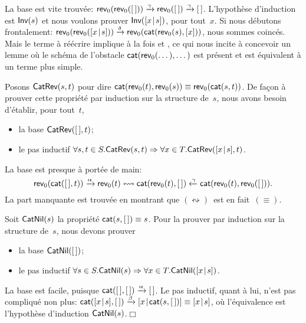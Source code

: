 La base est vite trouvée: \(\textsf{rev}_0(\textsf{rev}_0([\,]))
\xrightarrow{\smash{\gamma}} \textsf{rev}_0([\,])
\xrightarrow{\smash{\gamma}} [\,]\). L'hypothèse d'induction est
\(\textsf{Inv}({s})\) et nous voulons prouver
\(\textsf{Inv}({[{x}\!\mid\!{s}]})\), pour
tout~\(x\).  Si nous débutons frontalement:
\(\textsf{rev}_0(\textsf{rev}_0([{x}\!\mid\!{s}])) \xrightarrow{\smash{\delta}}
\textsf{rev}_0(\textsf{cat}(\textsf{rev}_0(s),[x]))\), nous sommes coincés.
Mais le terme à réécrire implique à la fois  et
, ce qui nous incite à concevoir un lemme où le schéma de
l'obstacle \(\textsf{cat}(\textsf{rev}_0(\dots),\dots)\) est présent et est
équivalent à un terme plus simple.%

Posons
\(\textsf{CatRev}({s,t})\) \label{CatRev}
pour dire \(\textsf{cat}(\textsf{rev}_0(t),\textsf{rev}_0(s)) \equiv
\textsf{rev}_0(\textsf{cat}(s,t))\). De façon à
prouver cette propriété par induction sur la structure de~\(s\), nous
avons besoin d'établir, pour tout~\(t\),
\begin{itemize}

  \item la base \(\textsf{CatRev}({[\,],t})\);

  \item le pas inductif \(\forall s,t \in S.\textsf{CatRev}({s,t})
    \Rightarrow \forall x \in T.\textsf{CatRev}({[{x}\!\mid\!{s}],t})\).

\end{itemize}
La base est presque à portée de main:
\begin{equation*}
\textsf{rev}_0(\textsf{cat}([\,],t)) \xrightarrow{\smash{\alpha}}
\textsf{rev}_0(t) \leftrightsquigarrow \textsf{cat}(\textsf{rev}_0(t),[\,])
\xleftarrow{\smash{\gamma}}
\textsf{cat}(\textsf{rev}_0(t),\textsf{rev}_0([\,])).
\end{equation*}
La part manquante est trouvée en montrant que
\((\leftrightsquigarrow)\)~est en
fait~\((\equiv)\).%

Soit \(\textsf{CatNil}({s})\) la
propriété \(\textsf{cat}(s,[\,]) \equiv s\). Pour
la prouver par induction sur la structure de~\(s\), nous devons
prouver
\begin{itemize}

  \item la base \(\textsf{CatNil}({[\,]})\);

  \item le pas inductif \(\forall s \in S.\textsf{CatNil}({s})
    \Rightarrow \forall x \in T.\textsf{CatNil}({[{x}\!\mid\!{s}]})\).

\end{itemize}
La base est facile, puisque \(\textsf{cat}([\,],[\,])
\xrightarrow{\smash{\alpha}} [\,]\). Le pas
inductif, quant à lui, n'est pas compliqué non plus:
\(\textsf{cat}([{x}\!\mid\!{s}],[\,]) \xrightarrow{\smash{\beta}}
[{x}\!\mid\!{\textsf{cat}(s,[\,])}] \equiv [{x}\!\mid\!{s}]\), où l'équivalence est
l'hypothèse d'induction
\(\textsf{CatNil}({s})\).\hfill\(\Box\)

